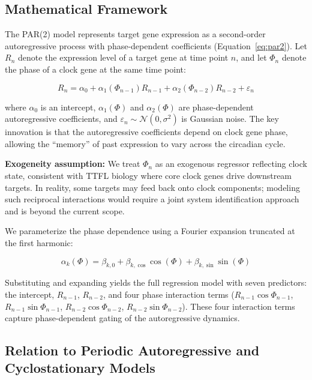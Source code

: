 \documentclass[11pt,a4paper]{article}
\begin{document}
\subsection{Mathematical Framework}

The PAR(2) model represents target gene expression as a second-order autoregressive process with phase-dependent coefficients (Equation~\ref{eq:par2}). Let $R_n$ denote the expression level of a target gene at time point $n$, and let $\Phi_n$ denote the phase of a clock gene at the same time point:

\begin{equation}
R_n = \alpha_0 + \alpha_1(\Phi_{n-1})R_{n-1} + \alpha_2(\Phi_{n-2})R_{n-2} + \varepsilon_n
\label{eq:par2}
\end{equation}

where $\alpha_0$ is an intercept, $\alpha_1(\Phi)$ and $\alpha_2(\Phi)$ are phase-dependent autoregressive coefficients, and $\varepsilon_n \sim \mathcal{N}(0, \sigma^2)$ is Gaussian noise. The key innovation is that the autoregressive coefficients depend on clock gene phase, allowing the ``memory'' of past expression to vary across the circadian cycle.

\textbf{Exogeneity assumption:} We treat $\Phi_n$ as an exogenous regressor reflecting clock state, consistent with TTFL biology where core clock genes drive downstream targets. In reality, some targets may feed back onto clock components; modeling such reciprocal interactions would require a joint system identification approach and is beyond the current scope.

We parameterize the phase dependence using a Fourier expansion truncated at the first harmonic:

\begin{equation}
\alpha_k(\Phi) = \beta_{k,0} + \beta_{k,\cos}\cos(\Phi) + \beta_{k,\sin}\sin(\Phi)
\label{eq:phase_dep}
\end{equation}

Substituting and expanding yields the full regression model with seven predictors: the intercept, $R_{n-1}$, $R_{n-2}$, and four phase interaction terms ($R_{n-1}\cos\Phi_{n-1}$, $R_{n-1}\sin\Phi_{n-1}$, $R_{n-2}\cos\Phi_{n-2}$, $R_{n-2}\sin\Phi_{n-2}$). These four interaction terms capture phase-dependent gating of the autoregressive dynamics.

\subsection{Relation to Periodic Autoregressive and Cyclostationary Models}
\end{document}
